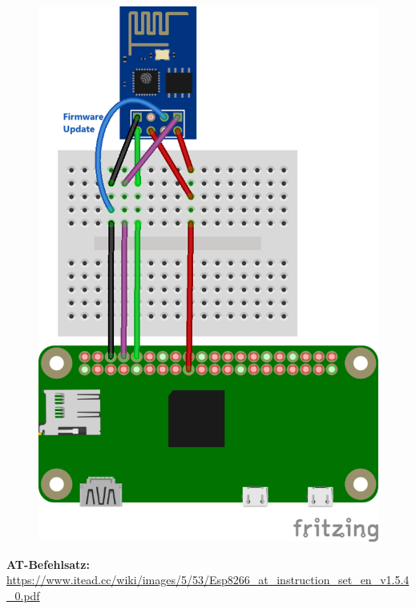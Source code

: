 \begin{figure}[ht]
  \centering
  \includegraphics[scale=1.00]{images/ESP8266_ESP-01.png}	
  \label{ESP8266_ESP-01}
\end{figure}



\textbf{AT-Befehlsatz:}\\
\url{https://www.itead.cc/wiki/images/5/53/Esp8266_at_instruction_set_en_v1.5.4_0.pdf}\\

